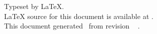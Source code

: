 
\thispagestyle{empty}
\vspace*{\fill}

Typeset by \LaTeX.
\\
{\LaTeX} source for this document is available at
.
\\
This document generated \GITAuthorDate\ from revision
\ifx\GITTags\empty
\GITAbrHash
\else
\GITAbrHash\ \GITTags
\fi
.
